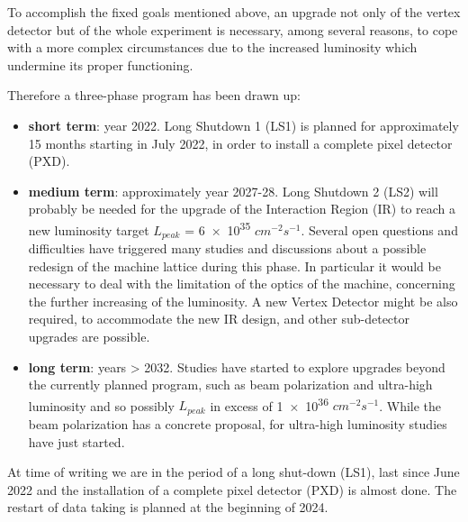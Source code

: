 To accomplish the fixed goals mentioned above, an upgrade not only of the vertex detector but of the whole experiment is necessary, among several reasons, to cope with a more complex circumstances due to the increased luminosity which undermine its proper functioning.

Therefore a three-phase program has been drawn up:

\begin{itemize}
\item \textbf{short term}: year 2022. Long Shutdown 1 (LS1) is planned for approximately 15 months starting in July 2022, in order to install a complete pixel detector (PXD).
\item \textbf{medium term}: approximately year 2027-28. Long Shutdown 2 (LS2) will probably be needed for the upgrade of the Interaction Region (IR) to reach a new luminosity target $\textit{L}_{peak}$ = \num{6e35} $cm^{-2}s^{-1}$. 
Several open questions and difficulties have triggered many studies and discussions about a possible redesign of the machine lattice during this phase. In particular it would be necessary to deal with the limitation of the optics of the machine, concerning the further increasing of the luminosity. A new Vertex Detector might be also required, to accommodate the new IR design, and other sub-detector upgrades are possible. 
\item \textbf{long term}: years > 2032. Studies have started to explore upgrades beyond the currently planned program, such as beam polarization and ultra-high luminosity and so possibly $\textit{L}_{peak}$ in excess of \num{1e36} $cm^{-2}s^{-1}$. While the beam polarization has a concrete proposal, for ultra-high luminosity studies have just started.
\end{itemize}

At time of writing we are in the period of a long shut-down (LS1), last since June 2022 and the installation of a complete pixel detector (PXD) is almost done. The restart of data taking is planned at the beginning of 2024.


\begin{comment}

Therefore a program has been drawn up and at time of writing we are in the period of a long shut-down (LS1), last since June 2022. It is planned for approximately 15 months in order to install a complete pixel detector (PXD), which is almost done. The restart of data taking is planned at the beginning of 2024. 


\end{comment}








